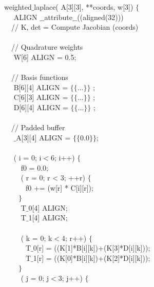 \setcounter{algocf}{0}%
\begin{algorithm}
\scriptsize\ttfamily
{}

 weighted$\_$laplace( A[3][3],  **coords,  w[3]) $\lbrace$\\
~~ ALIGN $\_\_$attribute$\_\_$((aligned(32))) \\
~~// K, det = Compute Jacobian (coords) \\
~~\\
~~// Quadrature weights \\
~~ W[6] ALIGN = {0.5}; \\
~~\\
~~// Basis functions \\
~~ B[6][4] ALIGN = $\lbrace\lbrace$...$\rbrace\rbrace$ ;\\
~~ C[6][3] ALIGN = $\lbrace\lbrace$...$\rbrace\rbrace$ ;\\
~~ D[6][4] ALIGN = $\lbrace\lbrace$...$\rbrace\rbrace$ ;\\
~~\\
~~// Padded buffer \\
~~ $\_$A[3][4] ALIGN = $\lbrace\lbrace$0.0$\rbrace\rbrace$;\\
~~\\
~~ ( i = 0; i$<$6; i++) $\lbrace$ \\
~~~~ f0  = 0.0;\\
~~~~ ( r  = 0; r < 3; ++r) $\lbrace$ \\
~~~~~~f0 += (w[r] * C[i][r]);\\
~~~~$\rbrace$ \\
~~~~ T$\_$0[4] ALIGN;\\
~~~~ T$\_$1[4] ALIGN;\\
~~~~\\
~~~~ ( k = 0; k$<$4; r++) $\lbrace$ \\
~~~~~~T$\_$0[r] = ((K[1]*B[i][k])+(K[3]*D[i][k]));\\
~~~~~~T$\_$1[r] = ((K[0]*B[i][k])+(K[2]*D[i][k]));\\
~~~~$\rbrace$\\
~~~~ ( j = 0; j$<$3; j++) $\lbrace$\\
~~~~~~\\

\end{algorithm}
